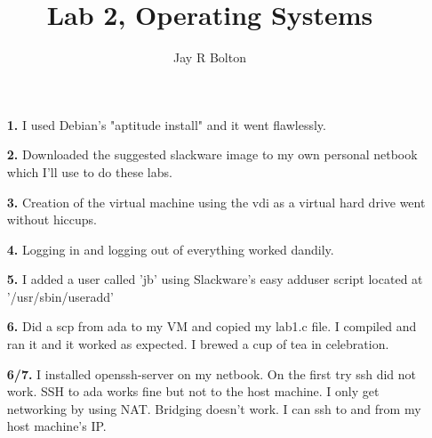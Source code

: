 \documentclass{article}
\title{Lab 2, Operating Systems}
\author{Jay R Bolton}
\begin{document}
\maketitle 

\begin{enumerate}

 \item[\textbf{1.}]
  I used Debian's "aptitude install" and it went flawlessly.
 
 \item[\textbf{2.}]
  Downloaded the suggested slackware image to my
  own personal netbook which I'll use to do these
  labs.

 \item[\textbf{3.}]
  Creation of the virtual machine using the vdi as a
  virtual hard drive went without hiccups.
  
 \item[\textbf{4.}]
  Logging in and logging out of everything worked dandily.

 \item[\textbf{5.}]
  I added a user called 'jb' using Slackware's easy adduser script located at
  '/usr/sbin/useradd'

 \item[\textbf{6.}]
  Did a scp from ada to my VM and copied my lab1.c file. I compiled and ran it
  and it worked as expected. I brewed a cup of tea in celebration.
  
 \item[\textbf{6/7.}]
  I installed openssh-server on my netbook. On the first try ssh did not work.
  SSH to ada works fine but not to the host machine. I only get networking by
  using NAT. Bridging doesn't work. I can ssh to and from my host machine's IP.
  

\end{enumerate}
\end{document}
